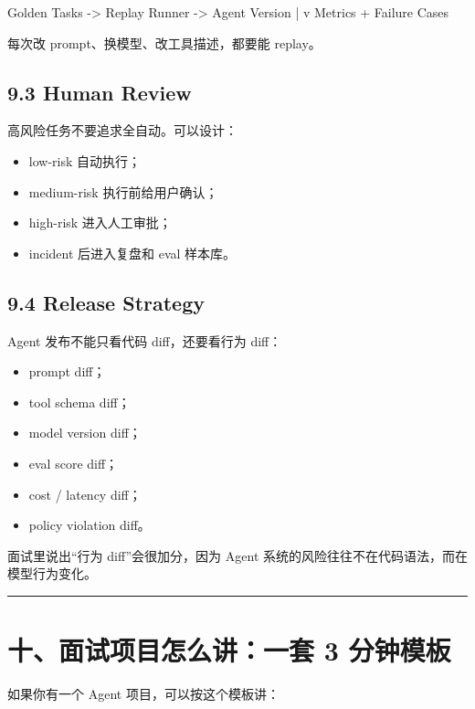 \begin{codeblock}
Golden Tasks -> Replay Runner -> Agent Version
                           |
                           v
                 Metrics + Failure Cases
\end{codeblock}

每次改 prompt、换模型、改工具描述，都要能 replay。


\subsection{9.3 Human Review}

高风险任务不要追求全自动。可以设计：


\begin{itemize}[leftmargin=2em]
\item low-risk 自动执行；
\item medium-risk 执行前给用户确认；
\item high-risk 进入人工审批；
\item incident 后进入复盘和 eval 样本库。
\end{itemize}

\subsection{9.4 Release Strategy}

Agent 发布不能只看代码 diff，还要看行为 diff：


\begin{itemize}[leftmargin=2em]
\item prompt diff；
\item tool schema diff；
\item model version diff；
\item eval score diff；
\item cost / latency diff；
\item policy violation diff。
\end{itemize}

面试里说出``行为 diff''会很加分，因为 Agent 系统的风险往往不在代码语法，而在模型行为变化。


\bigskip\hrule\bigskip

\section{十、面试项目怎么讲：一套 3 分钟模板}

如果你有一个 Agent 项目，可以按这个模板讲：


